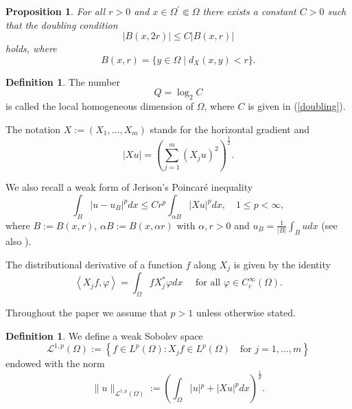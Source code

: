 \documentclass[a4paper,12pt,reqno]{amsart}
\renewcommand\eqref[1]{(\ref{#1})} %
\numberwithin{equation}{section}
\theoremstyle{plain}
\newtheorem{prop}[thm]{Proposition}
\theoremstyle{definition}
\newtheorem{defn}[thm]{Definition}
\begin{document}
\begin{prop}\cite[p. 111]{NSW1985}\label{doubling condition}
For all $r>0$ and $x\in \Omega^{'}\Subset \Omega$ there exists a constant $C>0$ such that the doubling condition 
\begin{equation}\label{doubling}
    |B(x,2r)|\leq C |B(x,r)|
\end{equation}
holds, where
\begin{equation*}
B(x, r)=\{y \in \Omega \mid d_{X}(x, y)<r\} .
\end{equation*}
\end{prop}
\begin{defn}
The number 
\begin{equation}\label{homogeneous dimension Q}
    Q=\log_{2}C
\end{equation}
is called the local homogeneous dimension of $\Omega$, where $C$ is given in \eqref{doubling}.    
\end{defn}

The notation $X:=\left(X_{1}, \ldots, X_{m}\right)$ stands for the horizontal gradient
and $$|X u|=\left(\sum_{j=1}^{m}\left(X_{j} u\right)^{2}\right)^{\frac{1}{2}}.$$

We also recall a weak form of Jerison's Poincar\'e inequality \cite{Jer1986} 
\begin{equation}\label{L1 Poincare}
\int_B\left|u-u_B\right|^p d x \leq C r^p \int_{\alpha B}|X u|^p d x, \quad 1 \leq p<\infty ,
\end{equation}
where $B:=B(x,r)$, $\alpha B:=B\left(x, \alpha r\right)$ with $\alpha,r>0$ and $u_B=\frac{1}{|B|} \int_B u d x$ (see also \cite[p. 1122]{GN1996}).



The distributional derivative of a function $f$ along  $X_{j}$ is given by the identity 
\begin{equation*}
\left\langle X_{j} f, \varphi\right\rangle=\int_{\Omega} f X_{j}^{*} \varphi d x\quad \text{ for all } \varphi \in C_{c}^{\infty}(\Omega).
\end{equation*}

Throughout the paper we assume that $p>1$ unless otherwise stated.
\begin{defn}
We define a weak Sobolev space \begin{equation*}
\mathscr{L}^{1, p}(\Omega):=\left\{f \in L^{p}(\Omega): X_{j} f \in L^{p}(\Omega)\quad \text{for } j=1, \ldots, m \right\}
\end{equation*}
endowed with the norm
\begin{equation*}\label{natural norm}
\|u\|_{\mathscr{L}^{1,p}(\Omega)}:=\left(\int_{\Omega}\left|u|^{p}+|X u\right|^{p} d x\right)^{\frac{1}{p}}.
\end{equation*}
\end{defn}
\end{document}
